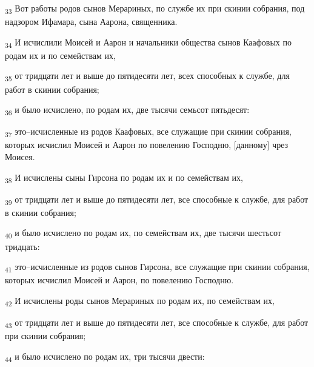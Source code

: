 \begin{tcolorbox}
\textsubscript{33} Вот работы родов сынов Мерариных, по службе их при скинии собрания, под надзором Ифамара, сына Аарона, священника.
\end{tcolorbox}
\begin{tcolorbox}
\textsubscript{34} И исчислили Моисей и Аарон и начальники общества сынов Каафовых по родам их и по семействам их,
\end{tcolorbox}
\begin{tcolorbox}
\textsubscript{35} от тридцати лет и выше до пятидесяти лет, всех способных к службе, для работ в скинии собрания;
\end{tcolorbox}
\begin{tcolorbox}
\textsubscript{36} и было исчислено, по родам их, две тысячи семьсот пятьдесят:
\end{tcolorbox}
\begin{tcolorbox}
\textsubscript{37} это--исчисленные из родов Каафовых, все служащие при скинии собрания, которых исчислил Моисей и Аарон по повелению Господню, [данному] чрез Моисея.
\end{tcolorbox}
\begin{tcolorbox}
\textsubscript{38} И исчислены сыны Гирсона по родам их и по семействам их,
\end{tcolorbox}
\begin{tcolorbox}
\textsubscript{39} от тридцати лет и выше до пятидесяти лет, все способные к службе, для работ в скинии собрания;
\end{tcolorbox}
\begin{tcolorbox}
\textsubscript{40} и было исчислено по родам их, по семействам их, две тысячи шестьсот тридцать:
\end{tcolorbox}
\begin{tcolorbox}
\textsubscript{41} это--исчисленные из родов сынов Гирсона, все служащие при скинии собрания, которых исчислил Моисей и Аарон, по повелению Господню.
\end{tcolorbox}
\begin{tcolorbox}
\textsubscript{42} И исчислены роды сынов Мерариных по родам их, по семействам их,
\end{tcolorbox}
\begin{tcolorbox}
\textsubscript{43} от тридцати лет и выше до пятидесяти лет, все способные к службе, для работ при скинии собрания;
\end{tcolorbox}
\begin{tcolorbox}
\textsubscript{44} и было исчислено по родам их, три тысячи двести:
\end{tcolorbox}

